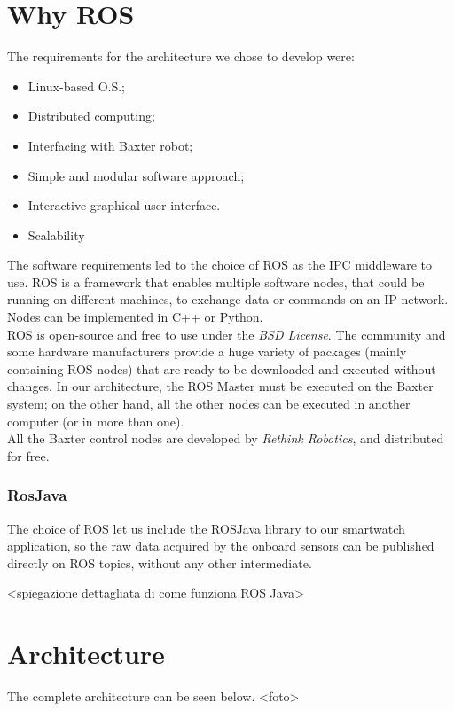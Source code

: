 \documentclass[12pt]{article}
\begin{document}
{\section*{Why ROS}

The requirements for the architecture we chose to develop were:

\begin{itemize}
\item Linux-based O.S.;
\item Distributed computing;
\item Interfacing with Baxter robot;
\item Simple and modular software approach;
\item Interactive graphical user interface.
\item Scalability
\end{itemize}
The software requirements led to the choice of ROS as the IPC middleware to use. ROS is a framework that enables multiple software nodes, that could be running on different machines, to exchange data or commands on an IP network. Nodes can be implemented in C++ or Python. \\ROS is open-source and free to use under the \textit{BSD License}. The community and some hardware manufacturers provide a huge variety of packages (mainly containing ROS nodes) that are ready to be downloaded and executed without changes. \newline
In our architecture, the ROS Master must be executed on the Baxter system; on the other hand, all the other nodes can be executed in another computer (or in more than one). \\
All the Baxter control nodes are developed by \textit{Rethink Robotics}, and distributed for free.

\subsubsection{RosJava}
The choice of ROS let us include the ROSJava library to our smartwatch application, so the raw data acquired by the onboard sensors can be published directly on ROS topics, without any other intermediate.

<spiegazione dettagliata di come funziona ROS Java>

\section{Architecture}
The complete architecture can be seen below. 
<foto> 

}
\end{document}
